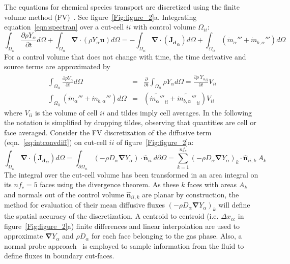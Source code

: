 \documentclass[journal,article,atmosphere,submit,moreauthors,pdftex]{Definitions/mdpi}
\begin{document}
The equations for chemical species transport are discretized using the finite volume method (FV)~\cite{eymard_2000,leveque_2002}. See figure~\ref{Fig:figure_2}a. Integrating equation~\eqref{eqn:spectran} over a cut-cell $ii$ with control volume $\Omega_{ii}$:
%
\begin{equation}
 \int_{\Omega_{ii}} {\frac{\partial \rho Y_\alpha}{\partial t}} d \Omega + \int_{\Omega_{ii}} { \boldsymbol{\nabla} \cdot  \left(  \rho Y_\alpha \mathbf{u} \right)
      } d \Omega  = -\int_{\Omega_{ii}} { \boldsymbol{\nabla} \cdot \left(  \mathbf{J_{d}}_\alpha  \right)  } d \Omega + \int_{\Omega_{ii}} {( \dot{m}_\alpha'''+\dot{m}_{b,\alpha}''') } d \Omega \label{eq:intconvdiff}
\end{equation}
%
For a control volume that does not change with time, the time derivative and source terms are approximated by
%
\begin{eqnarray}
  \int_{\Omega_{ii}} {\frac{\partial \rho Y_\alpha}{\partial t}} d \Omega & = & \frac{\partial}{\partial t} \int_{\Omega_{ii}} {\rho Y_\alpha} d \Omega
  = \frac{\partial \widetilde{\rho \: Y_\alpha }_{ii}}{\partial t} V_{ii} \\
  \int_{\Omega_{ii}} {( \dot{m}_\alpha''' +\dot{m}_{b,\alpha}''')} d \Omega & = & (\widetilde{ \dot{m}_\alpha''' }_{ii}+ \widetilde{\dot{m}_{b,\alpha}'''}_{ii}) V_{ii} \label{eq:intcons}
\end{eqnarray}
%
where $V_{ii}$ is the volume of cell $ii$ and tildes imply cell averages. In the following the notation is simplified by dropping tildes, observing that quantities are cell or face averaged. Consider the FV discretization of the diffusive term (eqn.~\eqref{eq:intconvdiff}) on cut-cell $ii$ of figure~\ref{Fig:figure_2}a:
%
\begin{equation}
\int_{\Omega_{ii}} { \boldsymbol{\nabla} \cdot \left(  \mathbf{J_{d}}_\alpha  \right)  } d \Omega =
    \int_{\partial \Omega_{ii}} { \left( - \rho D_\alpha \boldsymbol{\nabla} Y_\alpha \right) \cdot \hat{\mathbf{n}}_{ii} } \: d \partial \Omega = \sum^{nf_c}_{k=1}
    \left( - \rho D_\alpha \boldsymbol{\nabla} Y_\alpha \right)_k \cdot \hat{\mathbf{n}}_{ii,k} \: A_k \label{eq:discfvdiffcc}
\end{equation}
%
The integral over the cut-cell volume has been transformed in an area integral on its $nf_c=5$ faces using the divergence theorem. As these $k$ faces with areas $A_k$ and normals out of the control volume $\hat{\mathbf{n}}_{ii,k}$ are planar by construction, the method for evaluation of their mean diffusive fluxes $\left( - \rho D_\alpha \boldsymbol{\nabla} Y_\alpha \right)_k$ will define the spatial accuracy of the discretization. A centroid to centroid (i.e. $\Delta x_{cc}$ in figure~\ref{Fig:figure_2}a) finite differences and linear interpolation are used to approximate $\boldsymbol{\nabla} Y_\alpha$ and $\rho D_\alpha$ for each face belonging to the gas phase. Also, a normal probe approach~\cite{balaras_2004} is employed to sample information from the fluid to define fluxes in boundary cut-faces. 
\end{document}
